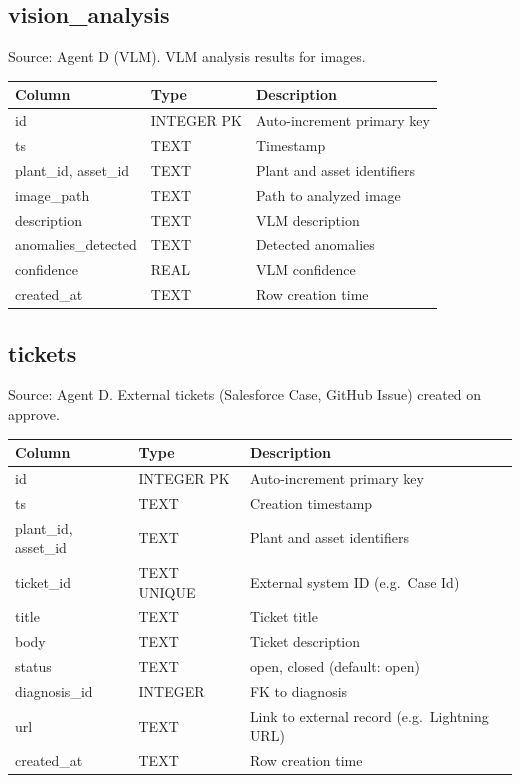 \documentclass[12pt,letterpaper]{report}
\begin{document}
\subsection*{vision\_analysis}
Source: Agent D (VLM). VLM analysis results for images.

\begin{tabular}{@{}llp{5.5cm}@{}}
\toprule
\textbf{Column} & \textbf{Type} & \textbf{Description} \\
\midrule
id & INTEGER PK & Auto-increment primary key \\
ts & TEXT & Timestamp \\
plant\_id, asset\_id & TEXT & Plant and asset identifiers \\
image\_path & TEXT & Path to analyzed image \\
description & TEXT & VLM description \\
anomalies\_detected & TEXT & Detected anomalies \\
confidence & REAL & VLM confidence \\
created\_at & TEXT & Row creation time \\
\bottomrule
\end{tabular}

\subsection*{tickets}
Source: Agent D. External tickets (Salesforce Case, GitHub Issue) created on approve.

\begin{tabular}{@{}llp{5.5cm}@{}}
\toprule
\textbf{Column} & \textbf{Type} & \textbf{Description} \\
\midrule
id & INTEGER PK & Auto-increment primary key \\
ts & TEXT & Creation timestamp \\
plant\_id, asset\_id & TEXT & Plant and asset identifiers \\
ticket\_id & TEXT UNIQUE & External system ID (e.g.\ Case Id) \\
title & TEXT & Ticket title \\
body & TEXT & Ticket description \\
status & TEXT & open, closed (default: open) \\
diagnosis\_id & INTEGER & FK to diagnosis \\
url & TEXT & Link to external record (e.g.\ Lightning URL) \\
created\_at & TEXT & Row creation time \\
\bottomrule
\end{tabular}
\end{document}
